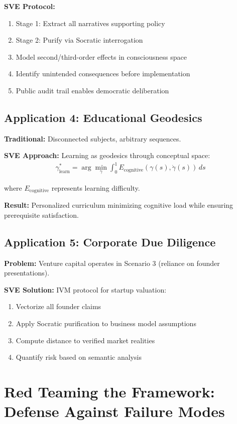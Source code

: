 \documentclass[11pt,a4paper]{article}
\theoremstyle{definition}
\theoremstyle{remark}
\begin{document}
\begin{small}
\textbf{SVE Protocol:}
\begin{enumerate}
\item Stage 1: Extract all narratives supporting policy
\item Stage 2: Purify via Socratic interrogation
\item Model second/third-order effects in consciousness space
\item Identify unintended consequences before implementation
\item Public audit trail enables democratic deliberation
\end{enumerate}

\subsection{Application 4: Educational Geodesics}

\textbf{Traditional:} Disconnected subjects, arbitrary sequences.

\textbf{SVE Approach:} Learning as geodesics through conceptual space:
\begin{align}
\gamma_{\text{learn}}^* = \arg\min_{\gamma} \int_0^1 E_{\text{cognitive}}(\gamma(s), \dot{\gamma}(s)) \, ds
\end{align}

where $E_{\text{cognitive}}$ represents learning difficulty.

\textbf{Result:} Personalized curriculum minimizing cognitive load while ensuring prerequisite satisfaction.

\subsection{Application 5: Corporate Due Diligence}

\textbf{Problem:} Venture capital operates in Scenario 3 (reliance on founder presentations).

\textbf{SVE Solution:} IVM protocol for startup valuation:
\begin{enumerate}
\item Vectorize all founder claims
\item Apply Socratic purification to business model assumptions
\item Compute distance to verified market realities
\item Quantify risk based on semantic analysis
\end{enumerate}

\section{Red Teaming the Framework: Defense Against Failure Modes}


\end{small}
\end{document}
